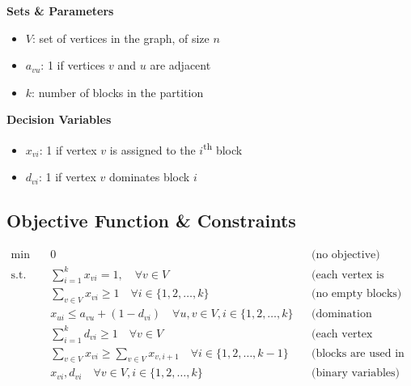 \noindent
\begin{minipage}[t]{0.48\textwidth}
\textbf{Sets \& Parameters}
\begin{itemize}[label=, noitemsep, topsep=0pt, leftmargin=2mm]
    \item $V$: set of vertices in the graph, of size $n$
    \item $a_{vu}$: 1 if vertices $v$ and $u$ are adjacent
    \item $k$: number of blocks in the partition
\end{itemize}
\end{minipage}
\hfill
\begin{minipage}[t]{0.48\textwidth}
\textbf{Decision Variables}
\begin{itemize}[label=, noitemsep, topsep=0pt, leftmargin=2mm]
    \item $x_{vi}$: 1 if vertex $v$ is assigned to the $i$\textsuperscript{th} block
    \item $d_{vi}$: 1 if vertex $v$ dominates block $i$
\end{itemize}
\end{minipage}

\subsection*{Objective Function \& Constraints}
\begin{align*}
    \min \quad &0 &&\text{(no objective)}\\
    \text{s.t.} \quad
    &\sum_{i=1}^{k} x_{vi} = 1, \quad \forall v \in V &&\text{(each vertex is assigned to one block)}\\
    &\sum_{v \in V} x_{vi} \geq 1 \quad \forall i \in \{1, 2, \dots, k\} &&\text{(no empty blocks)}\\
    &x_{ui} \leq a_{vu} + (1 - d_{vi}) \quad \forall u,v \in V, i \in \{1, 2, \dots, k\} &&\text{(domination condition)}\\
    &\sum_{i=1}^{k} d_{vi} \geq 1 \quad \forall v \in V &&\text{(each vertex dominates at least one block)}\\
    & \sum_{v \in V} x_{vi} \geq \sum_{v \in V} x_{v,i+1} \quad \forall i \in \{1, 2, \dots, k-1\} &&\text{(blocks are used in order)}\\
    &x_{vi}, d_{vi} \quad \forall v \in V, i \in \{1, 2, \dots, k\} &&\text{(binary variables)}\\
\end{align*}
